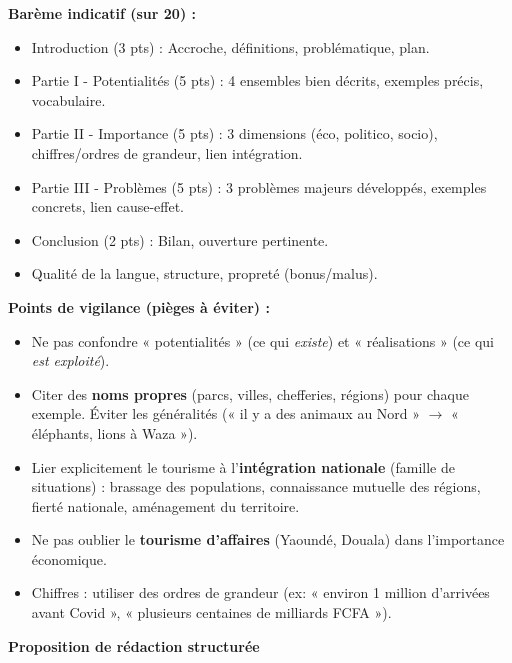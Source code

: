 \documentclass[11pt]{article}
\begin{document}
\begin{corrige}

\textbf{Barème indicatif (sur 20) :}
\begin{itemize}
\item Introduction (3 pts) : Accroche, définitions, problématique, plan.
\item Partie I - Potentialités (5 pts) : 4 ensembles bien décrits, exemples précis, vocabulaire.
\item Partie II - Importance (5 pts) : 3 dimensions (éco, politico, socio), chiffres/ordres de grandeur, lien intégration.
\item Partie III - Problèmes (5 pts) : 3 problèmes majeurs développés, exemples concrets, lien cause-effet.
\item Conclusion (2 pts) : Bilan, ouverture pertinente.
\item Qualité de la langue, structure, propreté (bonus/malus).
\end{itemize}

\textbf{Points de vigilance (pièges à éviter) :}
\begin{itemize}
\item Ne pas confondre « potentialités » (ce qui \emph{existe}) et « réalisations » (ce qui \emph{est exploité}).
\item Citer des \textbf{noms propres} (parcs, villes, chefferies, régions) pour chaque exemple. Éviter les généralités (« il y a des animaux au Nord » $\to$ « éléphants, lions à Waza »).
\item Lier explicitement le tourisme à l'\textbf{intégration nationale} (famille de situations) : brassage des populations, connaissance mutuelle des régions, fierté nationale, aménagement du territoire.
\item Ne pas oublier le \textbf{tourisme d'affaires} (Yaoundé, Douala) dans l'importance économique.
\item Chiffres : utiliser des ordres de grandeur (ex: « environ 1 million d'arrivées avant Covid », « plusieurs centaines de milliards FCFA »).
\end{itemize}

\textbf{Proposition de rédaction structurée}


\end{corrige}
\end{document}
